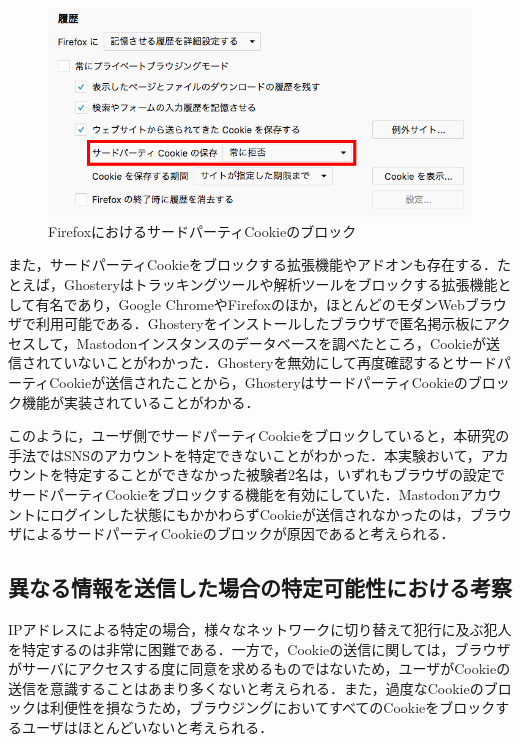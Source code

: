 \documentclass[10pt, a4paper]{jreport}
\begin{document}
\begin{figure}[H]
	\begin{center}
		\includegraphics[width=130mm]{figures/disable_third_party_cookie_on_firefox.png}
	\end{center}
	\caption{FirefoxにおけるサードパーティCookieのブロック}
	\label{fig: disable_third_party_cookie_on_firefox}
\end{figure}

また，サードパーティCookieをブロックする拡張機能やアドオンも存在する．たとえば，Ghosteryはトラッキングツールや解析ツールをブロックする拡張機能として有名であり，Google ChromeやFirefoxのほか，ほとんどのモダンWebブラウザで利用可能である．Ghosteryをインストールしたブラウザで匿名掲示板にアクセスして，Mastodonインスタンスのデータベースを調べたところ，Cookieが送信されていないことがわかった．Ghosteryを無効にして再度確認するとサードパーティCookieが送信されたことから，GhosteryはサードパーティCookieのブロック機能が実装されていることがわかる．

このように，ユーザ側でサードパーティCookieをブロックしていると，本研究の手法ではSNSのアカウントを特定できないことがわかった．本実験おいて，アカウントを特定することができなかった被験者2名は，いずれもブラウザの設定でサードパーティCookieをブロックする機能を有効にしていた．Mastodonアカウントにログインした状態にもかかわらずCookieが送信されなかったのは，ブラウザによるサードパーティCookieのブロックが原因であると考えられる．

\subsection{異なる情報を送信した場合の特定可能性における考察}
IPアドレスによる特定の場合，様々なネットワークに切り替えて犯行に及ぶ犯人を特定するのは非常に困難である．一方で，Cookieの送信に関しては，ブラウザがサーバにアクセスする度に同意を求めるものではないため，ユーザがCookieの送信を意識することはあまり多くないと考えられる．また，過度なCookieのブロックは利便性を損なうため，ブラウジングにおいてすべてのCookieをブロックするユーザはほとんどいないと考えられる．
\end{document}
